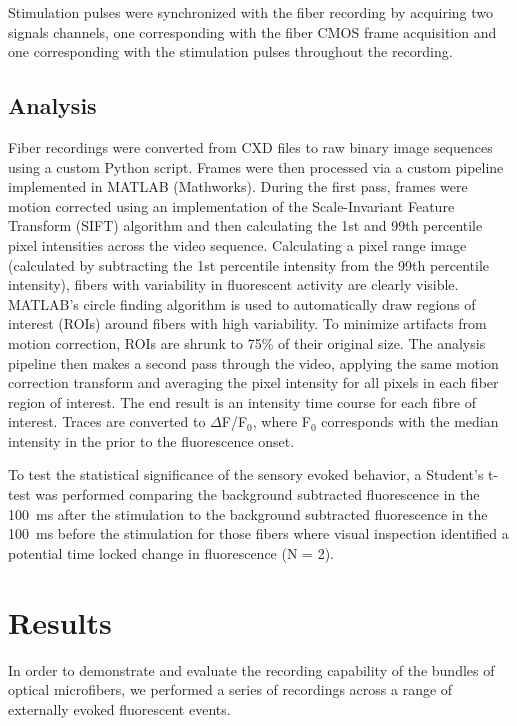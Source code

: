 Stimulation pulses were synchronized with the fiber recording by 
acquiring two signals channels, one corresponding with the fiber CMOS 
frame acquisition and one corresponding with the stimulation pulses 
throughout the recording.

\subsection{Analysis}

Fiber recordings were converted from CXD files to raw binary image 
sequences using a custom Python script. Frames were then processed via
 a custom pipeline implemented in MATLAB (Mathworks). During the first
 pass, frames were motion corrected using an implementation of the 
Scale-Invariant Feature Transform (SIFT) algorithm 
\cite{vedaldi08vlfeat,lowe1999object,Lowe:2004kp} and then calculating
 the 1st and 99th percentile pixel intensities across the video 
sequence. Calculating a pixel range image (calculated by subtracting 
the 1st percentile intensity from the 99th percentile intensity), 
fibers with variability in fluorescent activity are clearly visible. 
MATLAB's circle finding algorithm \cite{Atherton:1999dl} is used to 
automatically draw regions of interest (ROIs) around fibers with high 
variability. To minimize artifacts from motion correction, ROIs are 
shrunk to 75\% of their original size. The analysis pipeline then 
makes a second pass through the video, applying the same motion 
correction transform and averaging the pixel intensity for all pixels 
in each fiber region of interest. The end result is an intensity time 
course for each fibre of interest. Traces are converted to 
$\Delta$F/F$_0$, where F$_0$ corresponds with the median intensity in the 
prior to the fluorescence onset.

To test the statistical significance of the sensory evoked behavior, a
 Student's t-test was performed comparing the background subtracted 
fluorescence in the 100~ms after the stimulation to the background 
subtracted fluorescence in the 100~ms before the stimulation for those
 fibers where visual inspection identified a potential time locked 
change in fluorescence (N = 2).

\section{Results}

In order to demonstrate and evaluate the recording capability of the 
bundles of optical microfibers, we performed a series of recordings 
across a range of externally evoked fluorescent events.

